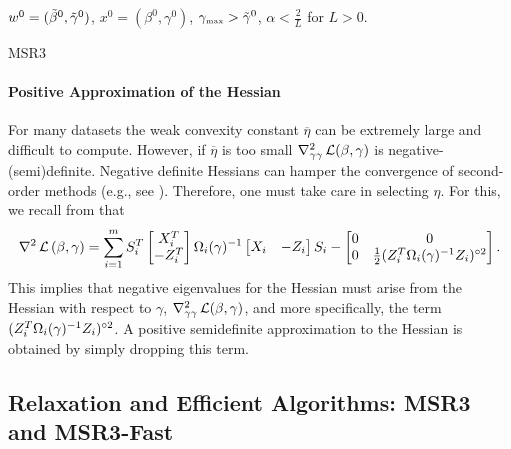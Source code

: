 \begin{algorithm}[H]
\SetAlgoLined
$w^0 = (\tilde\beta^0, \tilde\gamma^0)$, $x^0 = (\beta^0, \gamma^0)$, ${\gamma_{\mbox{\tiny max}}}>{\tilde{\gamma}}^0$, $\alpha < \frac{2}{L}$ 
for $L>0$.\\
\caption{\label{alg:MSR3} MSR3}
\end{algorithm}
\medskip

\paragraph{Positive Approximation of the Hessian}
For many datasets the weak convexity constant $\overline \eta$ can be extremely large 
and difficult to compute. However, if $\overline \eta$ is too small $\nabla^2_{\gamma\gamma}\operatorname{\mathcal{L}}(\beta, \gamma)$ is 
negative-(semi)definite. Negative definite Hessians can hamper the convergence of 
second-order methods (e.g., see \cite{nocedal2006numerical}). 
Therefore, one must take care in selecting $\eta$. For this, we recall from
\cite[Lemma 3]{Theory1} that
\begin{equation} %
\nabla^2\LL{(\beta,\gam)}=\sum_{i=1}^m
S_i^T\begin{bmatrix}X_i^T\\ -Z_i^T\end{bmatrix}
\Omega_i(\gam)^{-1}
\begin{bmatrix}X_i& -Z_i\end{bmatrix}S_i
-\begin{bmatrix}
0&0\\ 0& \half(Z_i^T\Omega_i(\gam)^{-1}Z_i)^{\circ2}
\end{bmatrix}.
\end{equation}
This implies that negative eigenvalues for the Hessian must arise from the
Hessian with respect to $\gamma$,
$\nabla^2_{\gamma\gamma}\operatorname{\mathcal{L}}(\beta, \gamma)$, and more specifically, the
term $(Z_i^T\Omega_i(\gamma)^{-1}Z_i)^{\circ2}$. 
A positive semidefinite approximation to the Hessian is obtained by simply dropping this term. 


\subsection{Relaxation and Efficient Algorithms: MSR3 and MSR3-Fast }
\label{sec:synthetic}

